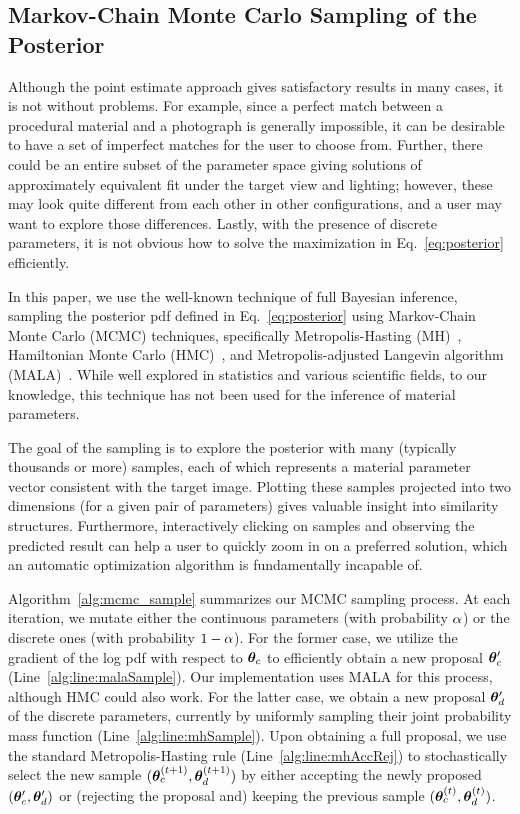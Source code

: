 

\subsection{Markov-Chain Monte Carlo Sampling of the Posterior}
\label{ssec:bayesian}
%
Although the point estimate approach gives satisfactory results in many cases, it is not without problems. For example, since a perfect match between a procedural material and a photograph is generally impossible, it can be desirable to have a set of imperfect matches for the user to choose from. Further, there could be an entire subset of the parameter space giving solutions of approximately equivalent fit under the target view and lighting; however, these may look quite different from each other in other configurations, and a user may want to explore those differences. Lastly, with the presence of discrete parameters, it is not obvious how to solve the maximization in Eq.~\eqref{eq:posterior} efficiently.

In this paper, we use the well-known technique of full Bayesian inference, sampling the posterior pdf defined in Eq.~\eqref{eq:posterior} using Markov-Chain Monte Carlo (MCMC) techniques, specifically Metropolis-Hasting (MH)~\cite{Hastings}, Hamiltonian Monte Carlo (HMC)~\cite{Betancourt2017}, and Metropolis-adjusted Langevin algorithm (MALA)~\cite{MALA}. While well explored in statistics and various scientific fields, to our knowledge, this technique has not been used for the inference of material parameters.

The goal of the sampling is to explore the posterior with many (typically thousands or more) samples, each of which represents a material parameter vector consistent with the target image. Plotting these samples projected into two dimensions (for a given pair of parameters) gives valuable insight into similarity structures. Furthermore, interactively clicking on samples and observing the predicted result can help a user to quickly zoom in on a preferred solution, which an automatic optimization algorithm is fundamentally incapable of.

Algorithm~\ref{alg:mcmc_sample} summarizes our MCMC sampling process. At each iteration, we mutate either the continuous parameters (with probability $\alpha$) or the discrete ones (with probability $1 - \alpha$).
For the former case, we utilize the gradient of the log pdf with respect to $\bm{\theta}_c$ to efficiently obtain a new proposal $\bm{\theta}_c'$ (Line~\ref{alg:line:malaSample}).
Our implementation uses MALA for this process, although HMC could also work.
For the latter case, we obtain a new proposal $\bm{\theta}_d'$ of the discrete parameters, currently by uniformly sampling their joint probability mass function (Line~\ref{alg:line:mhSample}).
Upon obtaining a full proposal, we use the standard Metropolis-Hasting rule (Line~\ref{alg:line:mhAccRej}) to stochastically select the new sample $(\bm{\theta}_c^{(t + 1)}, \bm{\theta}_d^{(t + 1)})$ by either accepting the newly proposed $(\bm{\theta}_c', \bm{\theta}_d')$ or (rejecting the proposal and) keeping the previous sample $(\bm{\theta}_c^{(t)}, \bm{\theta}_d^{(t)})$.

